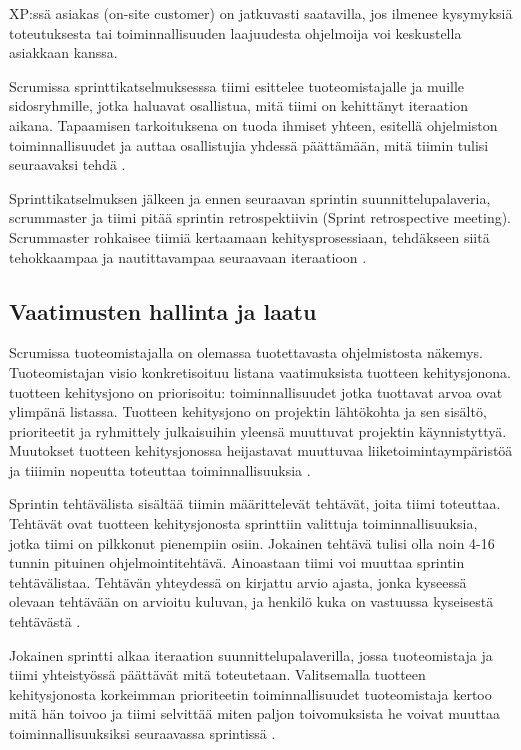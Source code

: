 \documentclass[finnish]{tktltiki2}
\theoremstyle{definition}
\theoremstyle{remark}
\begin{document}
XP:ssä asiakas (on-site customer) on jatkuvasti saatavilla, jos ilmenee kysymyksiä toteutuksesta tai toiminnallisuuden laajuudesta ohjelmoija voi keskustella asiakkaan kanssa.

Scrumissa sprinttikatselmuksesssa tiimi esittelee tuoteomistajalle ja muille sidosryhmille, jotka haluavat osallistua, mitä tiimi on kehittänyt iteraation aikana. Tapaamisen tarkoituksena on tuoda ihmiset yhteen, esitellä ohjelmiston toiminnallisuudet ja auttaa osallistujia yhdessä päättämään, mitä tiimin tulisi seuraavaksi tehdä \cite{SCH09}. 

Sprinttikatselmuksen jälkeen ja ennen seuraavan sprintin suunnittelupalaveria, scrummaster ja tiimi pitää sprintin retrospektiivin (Sprint retrospective meeting). Scrummaster rohkaisee tiimiä kertaamaan kehitysprosessiaan, tehdäkseen siitä tehokkaampaa ja nautittavampaa seuraavaan iteraatioon \cite{SCH09}.

\subsection{Vaatimusten hallinta ja laatu}

Scrumissa tuoteomistajalla on olemassa tuotettavasta ohjelmistosta näkemys. Tuoteomistajan visio konkretisoituu listana vaatimuksista tuotteen kehitysjonona. tuotteen kehitysjono on priorisoitu: toiminnallisuudet jotka tuottavat arvoa ovat ylimpänä listassa. Tuotteen kehitysjono on projektin lähtökohta ja sen sisältö, prioriteetit ja ryhmittely julkaisuihin yleensä muuttuvat projektin käynnistyttyä. Muutokset tuotteen kehitysjonossa heijastavat muuttuvaa liiketoimintaympäristöä ja tiiimin nopeutta toteuttaa toiminnallisuuksia \cite{SCH09}.

Sprintin tehtävälista sisältää tiimin määrittelevät tehtävät, joita tiimi toteuttaa. Tehtävät ovat tuotteen kehitysjonosta sprinttiin valittuja toiminnallisuuksia, jotka tiimi on pilkkonut pienempiin osiin. Jokainen tehtävä tulisi olla noin 4-16 tunnin pituinen ohjelmointitehtävä. Ainoastaan tiimi voi muuttaa sprintin tehtävälistaa. Tehtävän yhteydessä on kirjattu arvio ajasta, jonka kyseessä olevaan tehtävään on arvioitu kuluvan, ja henkilö kuka on vastuussa kyseisestä tehtävästä \cite{SCH09}.

Jokainen sprintti alkaa iteraation suunnittelupalaverilla, jossa tuoteomistaja ja tiimi yhteistyössä päättävät mitä toteutetaan. Valitsemalla tuotteen kehitysjonosta korkeimman prioriteetin toiminnallisuudet tuoteomistaja kertoo mitä hän toivoo ja tiimi selvittää miten paljon toivomuksista he voivat muuttaa toiminnallisuuksiksi seuraavassa sprintissä \cite{SCH09}.
\end{document}
